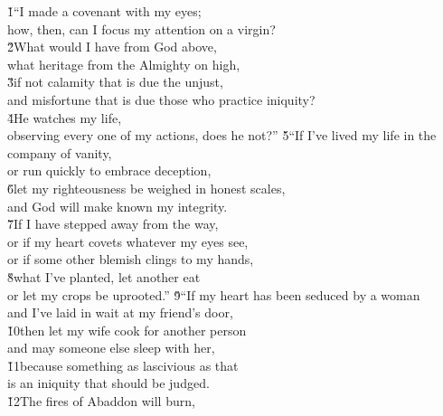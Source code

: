 \begin{poetry}
\poeml {}
\v{1}``I made a covenant with my eyes; \\
\poemll    how, then, can I focus my attention on a virgin? \\
\poeml \v{2}What would I have from God above, \\
\poemll    what heritage from the Almighty on high, \\
\poeml \v{3}if not calamity that is due the unjust, \\
\poemll    and misfortune that is due those who practice iniquity? \\
\poeml \v{4}He watches my life, \\
\poemll    observing every one of my actions, does he not?''
\poeml \v{5}``If I've lived my life in the company of vanity, \\
\poemll    or run quickly to embrace deception, \\
\poeml \v{6}let my righteousness be weighed in honest scales, \\
\poemll    and God will make known my integrity. \\
\poeml \v{7}If I have stepped away from the way, \\
\poemll    or if my heart covets whatever my eyes see, \\
\poemlll       or if some other blemish clings to my hands, \\
\poeml \v{8}what I've planted, let another eat \\
\poemll    or let my crops be uprooted.''
\poeml \v{9}``If my heart has been seduced by a woman \\
\poemll    and I've laid in wait at my friend's door, \\
\poeml \v{10}then let my wife cook for another person \\
\poemll    and may someone else sleep with her, \\
\poeml \v{11}because something as lascivious as that \\
\poemll    is an iniquity that should be judged. \\
\poeml \v{12}The fires of Abaddon will burn, \\

\end{poetry}
